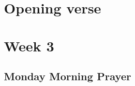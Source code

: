 

\chapter{Opening verse}

{%
\parindent 0pt
\noindent
\ifx\preLilyPondExample \undefined
\else
  \expandafter\preLilyPondExample
\fi
\def\lilypondbook{}%

\ifx\postLilyPondExample \undefined
\else
  \expandafter\postLilyPondExample
\fi
}

\chapter{Week 3}




\section{Monday Morning Prayer}

{%
\parindent 0pt
\noindent
\ifx\preLilyPondExample \undefined
\else
  \expandafter\preLilyPondExample
\fi
\def\lilypondbook{}%

\ifx\postLilyPondExample \undefined
\else
  \expandafter\postLilyPondExample
\fi
}


\null\medskip{%
\parindent 0pt
\noindent
\ifx\preLilyPondExample \undefined
\else
  \expandafter\preLilyPondExample
\fi
\def\lilypondbook{}%

\ifx\postLilyPondExample \undefined
\else
  \expandafter\postLilyPondExample
\fi
}

\newpage

{%
\parindent 0pt
\noindent
\ifx\preLilyPondExample \undefined
\else
  \expandafter\preLilyPondExample
\fi
\def\lilypondbook{}%

\ifx\postLilyPondExample \undefined
\else
  \expandafter\postLilyPondExample
\fi
}

\null\medskip{%
\parindent 0pt
\noindent
\ifx\preLilyPondExample \undefined
\else
  \expandafter\preLilyPondExample
\fi
\def\lilypondbook{}%

\ifx\postLilyPondExample \undefined
\else
  \expandafter\postLilyPondExample
\fi
}

